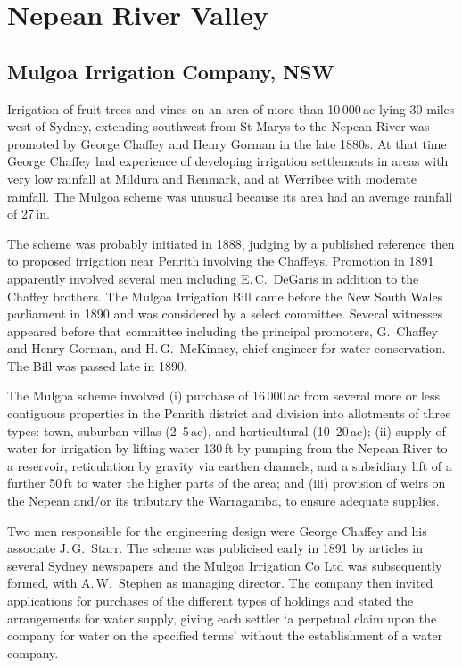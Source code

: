 \section*{Nepean River Valley}

\subsection*{Mulgoa Irrigation Company, NSW}

Irrigation of fruit trees and vines on an area of more than
10\,000\,ac lying 30 miles west of Sydney, extending southwest from St
Marys to the Nepean River was promoted by George Chaffey and Henry
Gorman in the late 1880s.  At that time George Chaffey had experience
of developing irrigation settlements in areas with very low rainfall
at Mildura and Renmark, and at Werribee with moderate rainfall.  The
Mulgoa scheme was unusual because its area had an average rainfall of
27\,in.

The scheme was probably initiated in 1888, judging by a published
reference then to proposed irrigation near Penrith involving the
Chaffeys.  Promotion in 1891
apparently involved several men including E.\,C.~DeGaris in addition
to the Chaffey brothers.  The Mulgoa Irrigation Bill came before the
New South Wales parliament in 1890 and was considered by a select
committee.  Several witnesses appeared before
that committee including the principal promoters, G.~Chaffey and Henry
Gorman, and H.\,G.~McKinney, chief engineer for water
conservation.  The Bill was passed late in 1890.

The Mulgoa scheme involved (i) purchase of 16\,000\,ac from several
more or less contiguous properties in the Penrith district and
division into allotments of three types: town, suburban villas
(2--5\,ac), and horticultural (10--20\,ac); (ii) supply of water for
irrigation by lifting water 130\,ft by pumping from the Nepean River
to a reservoir, reticulation by gravity via earthen channels, and a
subsidiary lift of a further 50\,ft to water the higher parts of the
area; and (iii) provision of weirs on the Nepean and/or its tributary
the Warragamba, to ensure adequate supplies.

Two men responsible for the engineering design were George Chaffey and
his associate J.\,G.~Starr.\fn{Sydney Morning Herald, 3 Jan.\ 1891.}
The scheme was publicised early in 1891 by articles in several Sydney
newspapers and the Mulgoa Irrigation Co Ltd was subsequently formed,
with A.\,W.~Stephen as managing director.  The company then invited
applications for purchases of the different types of holdings and
stated the arrangements for water supply, giving each settler `a
perpetual claim upon the company for water on the specified terms'
without the establishment of a water company.

